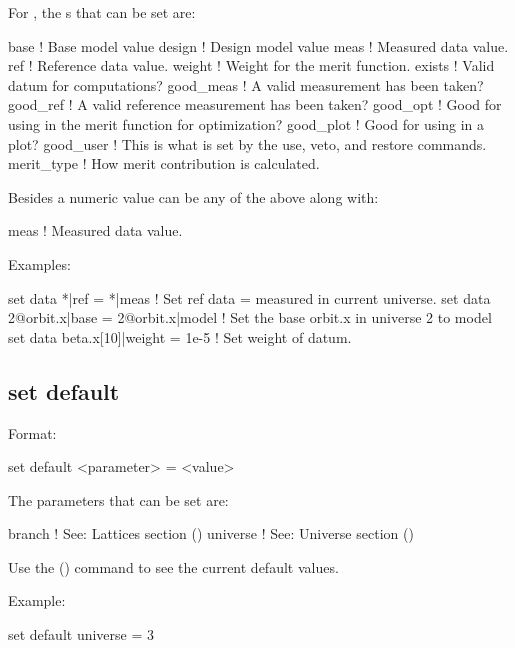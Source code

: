 {{For , the s that can be set are:
\begin{example}
  base        ! Base model value
  design      ! Design model value
  meas        ! Measured data value.
  ref         ! Reference data value.
  weight      ! Weight for the merit function.
  exists      ! Valid datum for computations?
  good_meas   ! A valid measurement has been taken?
  good_ref    ! A valid reference measurement has been taken?
  good_opt    ! Good for using in the merit function for optimization?
  good_plot   ! Good for using in a plot?
  good_user   ! This is what is set by the use, veto, and restore commands.
  merit_type  ! How merit contribution is calculated.
\end{example}
Besides a numeric value  can be any of the above along with:
\begin{example}
  meas        ! Measured data value.
\end{example}

Examples:
\begin{example}
  set data *|ref = *|meas            ! Set ref data = measured in current universe.
  set data 2@orbit.x|base = 2@orbit.x|model 
                                     ! Set the base orbit.x in universe 2 to model
  set data beta.x[10]|weight = 1e-5  ! Set weight of datum.
\end{example}


\subsection{set default}
\label{s:set.default}

Format:
\begin{example}
  set default <parameter> = <value>
\end{example}

The parameters that can be set are:
\begin{example}
  branch            ! See: Lattices section ()
  universe          ! See: Universe section ()
\end{example}

Use the  () command to see the current
default values.

Example:
\begin{example}
  set default universe = 3
\end{example}

}}
